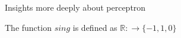 \documentclass{beamer}
\begin{document}

\begin{frame}{Insights more deeply about perceptron}

The function $sing$ is defined as $\mathbb{R}
: \longrightarrow \{-1,1,0\}$


\end{frame}
\end{document}
